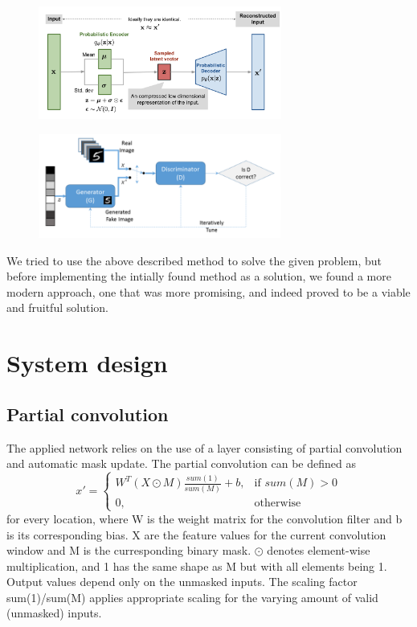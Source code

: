 \documentclass[conference]{IEEEtran}
\begin{document}
\begin{figure}[H]
  \centering
  \includegraphics[width=80mm, keepaspectratio]{figures/vae-gaussian.png}
\end{figure}

\begin{figure}[H]
  \centering
  \includegraphics[width=80mm, keepaspectratio]{figures/GAN_basic_flow.png}
\end{figure}

We tried to use the above described method to solve the given problem, but before implementing the intially found method as a solution, we found a more modern approach, one that was more promising, and indeed proved to be a viable and fruitful solution.

\section{System design}
\subsection{Partial convolution}
The applied network relies on the use of a layer consisting of partial convolution and automatic mask update.
The partial convolution can be defined as
\begin{equation}
{x}' = \begin{cases}
W^T(X \odot M) \frac{sum(1)}{sum(M)} + b, & \text{if } sum(M) > 0 \\
0, & \text{otherwise}
\end{cases}
\end{equation}
for every location, where W is the weight matrix for the convolution filter and b is its corresponding bias. X are the feature values for the current convolution window and M is the curresponding binary mask.
$\odot$ denotes element-wise multiplication, and 1 has the same shape as M but with all elements being 1. Output values depend only on the unmasked inputs. The scaling factor sum(1)/sum(M) applies appropriate scaling for the varying amount of valid (unmasked) inputs.
\end{document}
